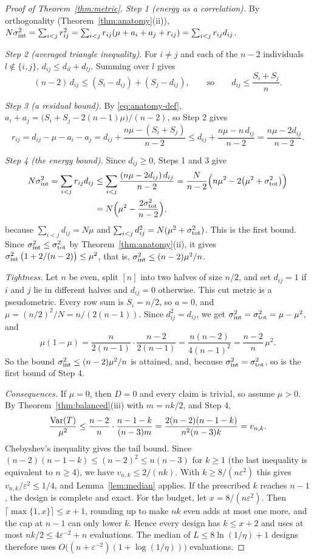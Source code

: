 \begin{proof}[Proof of Theorem~\ref{thm:metric}]
\emph{Step 1 (energy as a correlation).} By orthogonality
(Theorem~\ref{thm:anatomy}(ii)),
$N\sigma^2_{\mathrm{int}}=\sum_{i<j}r_{ij}^2=\sum_{i<j}r_{ij}(\mu+a_i+a_j+r_{ij})=\sum_{i<j}r_{ij}d_{ij}$.

\emph{Step 2 (averaged triangle inequality).} For $i\neq j$ and each of the $n-2$
individuals $l\notin\{i,j\}$, $d_{ij}\le d_{il}+d_{lj}$. Summing over $l$ gives
\[
(n-2)\,d_{ij}\le(S_i-d_{ij})+(S_j-d_{ij}),
\qquad\text{so}\qquad
d_{ij}\le\frac{S_i+S_j}{n} .
\]

\emph{Step 3 (a residual bound).} By \eqref{eq:anatomy-def},
$a_i+a_j={\big(S_i+S_j-2(n-1)\mu\big)/(n-2)}$, so Step 2 gives
\[
r_{ij}=d_{ij}-\mu-a_i-a_j=d_{ij}+\frac{n\mu-(S_i+S_j)}{n-2}
\le d_{ij}+\frac{n\mu-n\,d_{ij}}{n-2}
=\frac{n\mu-2d_{ij}}{n-2} .
\]

\emph{Step 4 (the energy bound).} Since $d_{ij}\ge0$, Steps 1 and 3 give
\begin{align*}
N\sigma^2_{\mathrm{int}}=\sum_{i<j}r_{ij}d_{ij}
&\le\sum_{i<j}\frac{(n\mu-2d_{ij})\,d_{ij}}{n-2}
=\frac{N}{n-2}\Big(n\mu^2-2\big(\mu^2+\sigma^2_{\mathrm{tot}}\big)\Big)\\
&=N\Big(\mu^2-\frac{2\sigma^2_{\mathrm{tot}}}{n-2}\Big),
\end{align*}
because $\sum_{i<j}d_{ij}=N\mu$ and $\sum_{i<j}d_{ij}^2=N(\mu^2+\sigma^2_{\mathrm{tot}})$. This is
the first bound. Since $\sigma^2_{\mathrm{int}}\le\sigma^2_{\mathrm{tot}}$ by Theorem~\ref{thm:anatomy}(ii), it
gives $\sigma^2_{\mathrm{int}}\,\big(1+2/(n-2)\big)\le\mu^2$, that is,
$\sigma^2_{\mathrm{int}}\le(n-2)\mu^2/n$.

\emph{Tightness.} Let $n$ be even, split $[n]$ into two halves of size $n/2$, and
set $d_{ij}=1$ if $i$ and $j$ lie in different halves and $d_{ij}=0$ otherwise.
This cut metric is a pseudometric. Every row sum is $S_i=n/2$, so $a=0$, and
$\mu=(n/2)^2/N=n/(2(n-1))$. Since $d_{ij}^2=d_{ij}$, we get
$\sigma^2_{\mathrm{int}}=\sigma^2_{\mathrm{tot}}=\mu-\mu^2$, and
\[
\mu(1-\mu)=\frac{n}{2(n-1)}\cdot\frac{n-2}{2(n-1)}=\frac{n(n-2)}{4(n-1)^2}
=\frac{n-2}{n}\,\mu^2 .
\]
So the bound $\sigma^2_{\mathrm{int}}\le(n-2)\mu^2/n$ is attained, and, because
$\sigma^2_{\mathrm{int}}=\sigma^2_{\mathrm{tot}}$, so is the first bound of Step 4.

\emph{Consequences.} If $\mu=0$, then $D=0$ and every claim is trivial, so assume
$\mu>0$. By Theorem~\ref{thm:balanced}(iii) with $m=nk/2$, and Step 4,
\[
\frac{\operatorname{Var}(T)}{\mu^2}\le\frac{n-2}{n}\cdot\frac{n-1-k}{(n-3)m}
=\frac{2(n-2)(n-1-k)}{n^2(n-3)k}=v_{n,k} .
\]
Chebyshev's inequality gives the tail bound. Since
${(n-2)(n-1-k)\le(n-2)^2\le n(n-3)}$ for $k\ge1$ (the last inequality is
equivalent to $n\ge4$), we have $v_{n,k}\le2/(nk)$. With $k\ge8/(n\varepsilon^2)$ this gives
$v_{n,k}/\varepsilon^2\le1/4$, and Lemma~\ref{lem:median} applies. If the
prescribed $k$ reaches $n-1$, the design is complete and exact. For the budget,
let $x=8/(n\varepsilon^2)$. Then $\lceil\max\{1,x\}\rceil\le x+1$, rounding up to
make $nk$ even adds at most one more, and the cap at $n-1$ can only lower $k$.
Hence every design has $k\le x+2$ and uses at most $nk/2\le4\varepsilon^{-2}+n$
evaluations. The median of $L\le8\ln(1/\eta)+1$ designs therefore uses
${O\big((n+\varepsilon^{-2})(1+\log(1/\eta))\big)}$ evaluations.
\end{proof}

